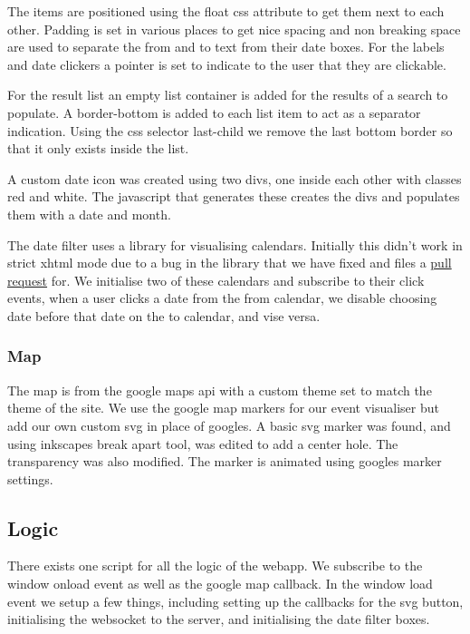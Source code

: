\documentclass[10pt]{article}
\begin{document}
                The items are positioned using the float css attribute to get them next to each other. Padding is set in various places to get nice spacing and non breaking space are used to separate the from and to text from their date boxes. For the labels and date clickers a pointer is set to indicate to the user that they are clickable.

                For the result list an empty list container is added for the results of a search to populate. A border-bottom is added to each list item to act as a separator indication. Using the css selector last-child we remove the last bottom border so that it only exists inside the list.

                A custom date icon was created using two divs, one inside each other with classes red and white. The javascript that generates these creates the divs and populates them with a date and month.

                The date filter uses a library for visualising calendars. Initially this didn't work in strict xhtml mode due to a bug in the library that we have fixed and files a \href{https://github.com/dbushell/Pikaday/pull/526}{pull request} for. We initialise two of these calendars and subscribe to their click events, when a user clicks a date from the from calendar, we disable choosing date before that date on the to calendar, and vise versa.

            \subsubsection{Map}
                The map is from the google maps api with a custom theme set to match the theme of the site. We use the google map markers for our event visualiser but add our own custom svg in place of googles. A basic svg marker was found, and using inkscapes break apart tool, was edited to add a center hole. The transparency was also modified. The marker is animated using googles marker settings.


        \subsection{Logic}
            There exists one script for all the logic of the webapp. We subscribe to the window onload event as well as the google map callback. In the window load event we setup a few things, including setting up the callbacks for the svg button, initialising the websocket to the server, and initialising the date filter boxes.
\end{document}
